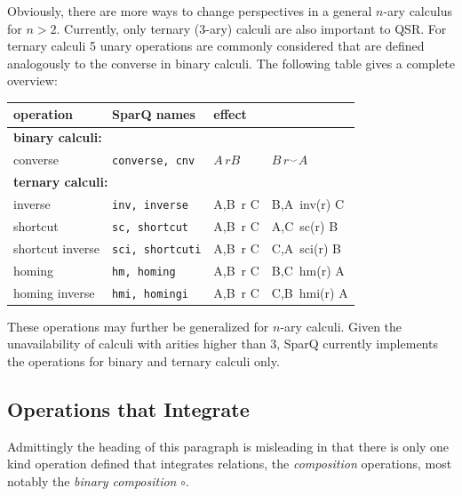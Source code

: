 \documentclass[headsepline]{scrreprt}
\theoremstyle{definition}
\newcommand{\engine}{SparQ}
\begin{document}
Obviously, there are more ways to change perspectives in a general $n$-ary calculus for $n>2$. Currently, only ternary (3-ary) calculi are also important to QSR. For ternary calculi 5 unary operations are commonly considered that are defined analogously to the converse in  binary calculi. The following table gives a complete overview:

\begin{center}
\begin{tabular}{|lll@{ $\leadsto$ }l|} \hline
{\bf operation} & {\bf \engine{} names} & \multicolumn{2}{l|}{{\bf effect}}\\ \hline \hline
%
\multicolumn{4}{|l|}{\bf binary calculi:}\\
converse & {\tt converse, cnv} & $A\, r B$ & $B\, r^{\smile} A$\\[1ex] \hline
%
\multicolumn{4}{|l|}{\bf ternary calculi:}\\
%
inverse & {\tt inv, inverse} & A,B\, r  C & B,A\, inv(r) C\\
shortcut & {\tt sc, shortcut} & A,B\, r  C & A,C\, sc(r) B\\
shortcut inverse & {\tt sci, shortcuti} & A,B\, r  C & C,A\, sci(r) B\\
homing & {\tt hm, homing} & A,B\, r C & B,C\, hm(r) A\\
homing inverse & {\tt hmi, homingi} & A,B\, r  C & C,B\, hmi(r) A\\ \hline
\end{tabular}
\end{center}

These operations may further be generalized for $n$-ary calculi.
Given the unavailability of calculi with arities higher than 3, SparQ currently implements the operations for binary and ternary calculi only.

\subsection{Operations that Integrate}
Admittingly the heading of this paragraph is misleading in that there is only one kind operation defined that integrates relations, the {\em composition} operations, most notably the {\em binary composition} $\circ$.
\end{document}
